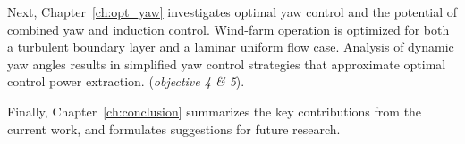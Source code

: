 Next, Chapter~\ref{ch:opt_yaw} investigates optimal yaw control and the potential of combined yaw and induction control. Wind-farm operation is optimized for both a turbulent boundary layer and a laminar uniform flow case. Analysis of dynamic yaw angles results in simplified yaw control strategies that approximate optimal control power extraction. (\emph{objective 4 \& 5}). 

Finally, Chapter~\ref{ch:conclusion} summarizes the key contributions from the current work, and formulates suggestions for future research. 


\cleardoublepage

